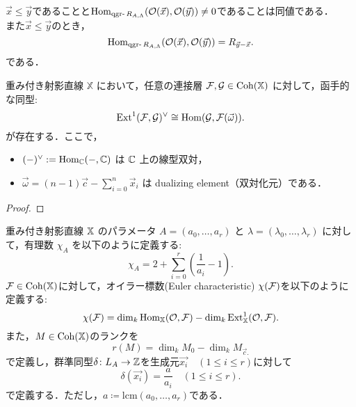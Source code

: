 \begin{prop}\label{lemm:qgr-hom-condition}
	$\vec{x}\le \vec{y}$であることと$\Hom_{\qgr R_{A,\Lambda}}(\mathcal{O}(\vec{x}),\mathcal{O}(\vec{y})) \neq 0$であることは同値である．\\
	また$\vec{x}\le\vec{y}$のとき，
	\[\Hom_{\qgr R_{A,\Lambda}}(\mathcal{O}(\vec{x}),\mathcal{O}(\vec{y}))= R_{\vec{y}- \vec{x}}.\]
	である．
\end{prop}

\begin{thm}\cite{GL87}
重み付き射影直線 $\mathbb{X}$ において，任意の連接層 $\mathcal{F}, \mathcal{G} \in \operatorname{\mathrm{Coh}}(\mathbb{X})$ に対して，函手的な同型:
\[
\operatorname{\mathrm{Ext}}^1(\mathcal{F}, \mathcal{G})^\vee \cong \operatorname{\mathrm{Hom}}(\mathcal{G}, \mathcal{F}(\vec{\omega})).
\]
が存在する．ここで，
\begin{itemize}
	\item $(-)^\vee := \operatorname{\mathrm{Hom}}_{{\mathbb C}}(-, {\mathbb C})$ は ${\mathbb C}$ 上の線型双対，
  \item $\vec{\omega} = (n - 1)\vec{c} - \sum_{i=0}^n \vec{x}_i$ は dualizing element（双対化元）である．
\end{itemize}
\end{thm}
\begin{proof}
	
\end{proof}

\begin{defn}
重み付き射影直線 ${\mathbb X}$ のパラメータ $A = (a_0, \dots, a_r)$ と $\lambda = (\lambda_0, \dots, \lambda_r)$ に対して，有理数 $\chi_A$ を以下のように定義する:
\[\chi_A = 2 + \sum_{i=0}^{r} \left( \frac{1}{a_i} - 1\right) .\]
${\mathcal F}\in\operatorname{\mathrm{Coh}}({\mathbb X})$に対して，オイラー標数(Euler characteristic) $\chi({\mathcal F})$を以下のように定義する:
\[ \chi(\mathcal{F}) = \dim_k \operatorname{\mathrm{Hom}}_{{\mathbb X}}(\mathcal{O}, \mathcal{F}) - \dim_k \operatorname{\mathrm{Ext}}^1_{{\mathbb X}}(\mathcal{O}, \mathcal{F}) .\]
また，$M\in\operatorname{\mathrm{Coh}}({\mathbb X})$のランクを
\[r(M) = \dim_k M_{0} - \dim_k M_{\vec{c}.}\]
 で定義し，群準同型$\delta\colon L_A\to {\mathbb Z}$を生成元$\vec{x_i}\quad (1\le i \le r)$に対して
\[\delta(\vec{x_i}) = \frac{a}{a_i}\quad (1\le i\le r).\]
で定義する．ただし，$a\coloneq \text{lcm}(a_0,\ldots ,a_r)$である．
\end{defn}

